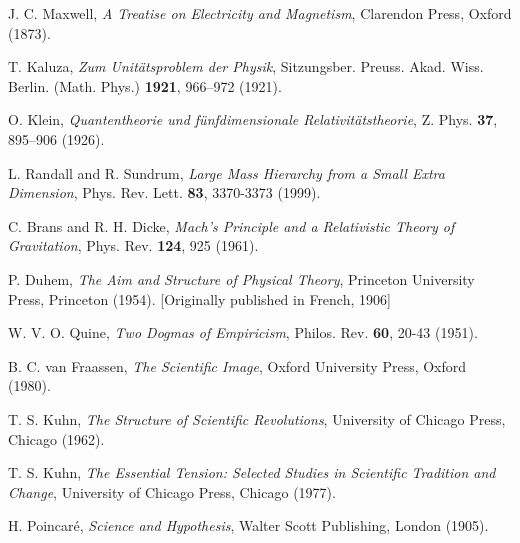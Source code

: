 \documentclass[12pt,a4paper]{article}
\begin{document}
\begin{thebibliography}{99}
		 J. C. Maxwell, \textit{A Treatise on Electricity and Magnetism}, Clarendon Press, Oxford (1873).
		
		 T. Kaluza, \textit{Zum Unitätsproblem der Physik}, Sitzungsber. Preuss. Akad. Wiss. Berlin. (Math. Phys.) \textbf{1921}, 966–972 (1921).
		
		 O. Klein, \textit{Quantentheorie und fünfdimensionale Relativitätstheorie}, Z. Phys. \textbf{37}, 895–906 (1926).
		
		 L. Randall and R. Sundrum, \textit{Large Mass Hierarchy from a Small Extra Dimension}, Phys. Rev. Lett. \textbf{83}, 3370-3373 (1999).
		
		 C. Brans and R. H. Dicke, \textit{Mach's Principle and a Relativistic Theory of Gravitation}, Phys. Rev. \textbf{124}, 925 (1961).
		
		 P. Duhem, \textit{The Aim and Structure of Physical Theory}, Princeton University Press, Princeton (1954). [Originally published in French, 1906]
		
		 W. V. O. Quine, \textit{Two Dogmas of Empiricism}, Philos. Rev. \textbf{60}, 20-43 (1951).
		
		 B. C. van Fraassen, \textit{The Scientific Image}, Oxford University Press, Oxford (1980).
		
		 T. S. Kuhn, \textit{The Structure of Scientific Revolutions}, University of Chicago Press, Chicago (1962).
		
		 T. S. Kuhn, \textit{The Essential Tension: Selected Studies in Scientific Tradition and Change}, University of Chicago Press, Chicago (1977).
		
		 H. Poincaré, \textit{Science and Hypothesis}, Walter Scott Publishing, London (1905).
	\end{thebibliography}
	
\end{document}
